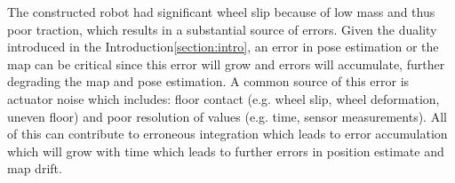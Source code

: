 The constructed robot had significant wheel slip because of low mass and thus poor traction, which results in a substantial source of errors.
Given the duality introduced in the Introduction\:\ref{section:intro}, an error in pose estimation or the map can be critical since this error will grow and errors will accumulate, further degrading the map and pose estimation\:\cite{siegwart_introduction_2011}\cite{zhao_occupancy-slam_2022}. A common source of this error is actuator noise which includes: floor contact (e.g. wheel slip, wheel deformation, uneven floor) and poor resolution of values (e.g. time, sensor measurements)\:\cite{siegwart_introduction_2011}\cite{corke_robotics_2023}. All of this can contribute to erroneous integration which leads to error accumulation which will grow with time which leads to further errors in position estimate and map drift\:\cite{siegwart_introduction_2011}\cite{corke_robotics_2023}.

\begin{comment}
Sensor errors will always be present and the SLAM algorithm is always going to make some mistakes. Thus the spatial correlation of map features introduced in the Introduction\:\ref{section:intro} will never achieve full correlation. This in turn will limit the awareness of the algorithm and its ability to make intelligent decisions, confining it to some degree to local information. The reason being that if full correlation is not achieved, then information of an object or feature (could also be the robot itself), does not necessarily allow the algorithm to determine how it relates to a second object, despite having seen both previously in this scenario. The algorithm can not use correlation information to figure this out because the correlation is not complete because of sensor errors and mistakes. Thus forcing the algorithm to rely on local sensor information, hurting its awareness and limiting its ability to make intelligent decisions. One can imagine the results of this being as if the map only contains disconnected fragments, and the robot being confined only to its current fragment, unable to see or make use of the entirety of the map. It is important to not mistakenly interpret that this concerns the absolute position of features on the map, this only concerns how features relate to each other, not their absolute position.
\end{comment}


